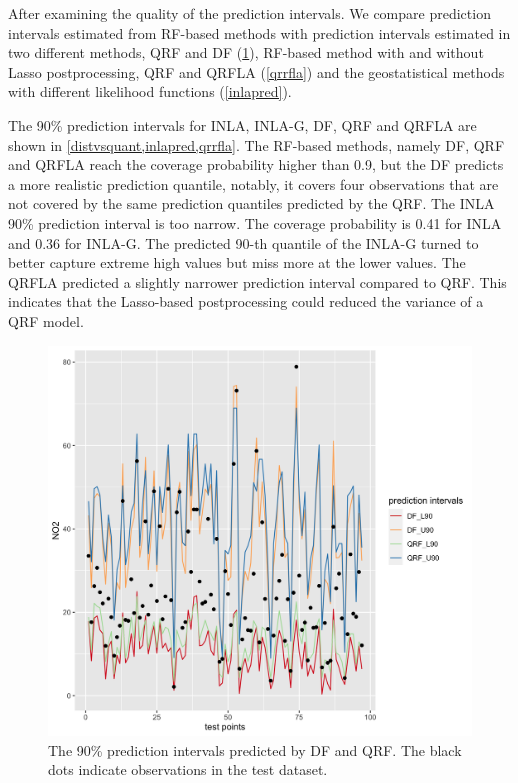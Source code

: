 \documentclass{article}
\begin{document}
After examining the quality of the prediction intervals. We compare prediction intervals estimated from RF-based methods with prediction intervals estimated in two different methods, QRF and DF (\cref{distvsquant}), RF-based method with and without Lasso postprocessing, QRF and QRFLA (\cref{qrrfla}) and the geostatistical methods with different likelihood functions (\cref{inlapred}). 
 
The 90\% prediction intervals for INLA, INLA-G, DF, QRF and QRFLA are shown in \cref{distvsquant,inlapred,qrrfla}. The RF-based methods, namely DF, QRF and QRFLA reach the coverage probability higher than 0.9, but the DF predicts a more realistic prediction quantile, notably, it covers four observations that are not covered by the same prediction quantiles predicted by the QRF. The INLA 90\% prediction interval is too narrow. The coverage probability is 0.41 for INLA and 0.36 for INLA-G. The predicted 90-th quantile of the INLA-G turned to better capture extreme high values but miss more at the lower values. The QRFLA predicted a slightly narrower prediction interval compared to QRF. This indicates that the Lasso-based postprocessing could reduced the variance of a QRF model.  

\label{sec:predinterval}
\begin{figure}
\centering
\includegraphics[scale = 0.2]{fig/qrf_df.png}
\caption{The 90\% prediction intervals predicted by DF and QRF. The black dots indicate observations in the test dataset.}
\label{distvsquant}
\end{figure}
\end{document}
